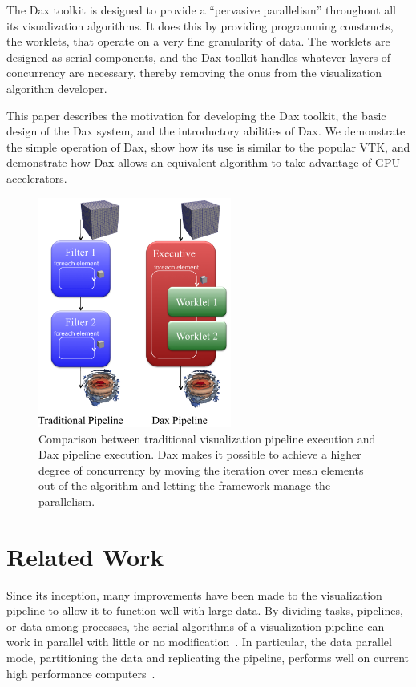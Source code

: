 \documentclass{vgtc}                          %
\newcommand*{\lcite}[1]{~\cite{#1}}
\begin{document}
The Dax toolkit is designed to provide a ``pervasive parallelism''
throughout all its visualization algorithms.  It does this by providing
programming constructs, the worklets, that operate on a very fine
granularity of data.  The worklets are designed as serial components, and
the Dax toolkit handles whatever layers of concurrency are necessary,
thereby removing the onus from the visualization algorithm developer.

This paper describes the motivation for developing the Dax toolkit, the
basic design of the Dax system, and the introductory abilities of Dax.  We
demonstrate the simple operation of Dax, show how its use is similar to the
popular VTK, and demonstrate how Dax allows an equivalent algorithm to take
advantage of GPU accelerators.

\begin{figure}
  \centering
  \includegraphics[width=2.5in]{images/DaxPipelineVsTraditionalPipeline}
  \caption{Comparison between traditional visualization pipeline execution
    and Dax pipeline execution. Dax makes it possible to achieve a higher
    degree of concurrency by moving the iteration over mesh elements out of
    the algorithm and letting the framework manage the parallelism.}
  \label{fig:DaxPipelineVsTraditionalPipeline}
\end{figure}

\section{Related Work}
\label{sec:RelatedWork}

Since its inception, many improvements have been made to the visualization
pipeline to allow it to function well with large data.  By dividing tasks,
pipelines, or data among processes, the serial algorithms of a
visualization pipeline can work in parallel with little or no
modification\lcite{Ahrens00}.  In particular, the data parallel
mode, partitioning the data and replicating the pipeline, performs
well on current high performance computers\lcite{Cedilnik06}.
\end{document}
